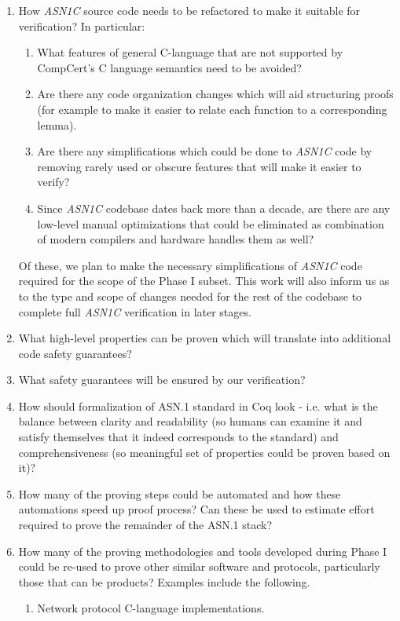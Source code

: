 \documentclass[acmsmall,nonacm]{acmart}
\begin{document}
\begin{enumerate}
\item How \emph{ASN1C} source code needs to be refactored to make it suitable for verification? In particular:
  \begin{enumerate}
  \item What features of general C-language that are not supported by CompCert's C language semantics need to be avoided?
  \item Are there any code organization changes which will aid structuring proofs (for example to make it easier to relate each function to a corresponding lemma).
  \item Are there any simplifications which could be done to \emph{ASN1C} code by removing rarely used or obscure features that will make it easier to verify?
  \item Since \emph{ASN1C} codebase dates back more than a decade, are there are any low-level manual optimizations that could be eliminated as combination of modern compilers and hardware handles them as well?
  \end{enumerate}
  Of these, we plan to make the necessary simplifications of \emph{ASN1C}
  code required for the scope of the Phase I subset. This work will
  also inform us as to the type and scope of changes needed for the
  rest of the codebase to complete full \emph{ASN1C} verification in later
  stages.
\item What high-level properties can be proven which will translate into additional code safety guarantees?
\item What safety guarantees will be ensured by our verification?
\item How should formalization of ASN.1 standard in Coq look - i.e. what is the balance between clarity and readability (so humans can examine it and satisfy themselves that it indeed corresponds to the standard) and comprehensiveness (so meaningful set of properties could be proven based on it)?
\item How many of the proving steps could be automated and how these automations speed up proof process? Can these be used to estimate effort required to prove the remainder of the ASN.1 stack?
\item How many of the proving methodologies and tools developed during
  Phase I could be re-used to prove other similar software and
  protocols, particularly those that can be products? Examples include
  the following.
  \begin{enumerate}
    \item Network protocol C-language implementations.

\end{enumerate}
\end{enumerate}
\end{document}

